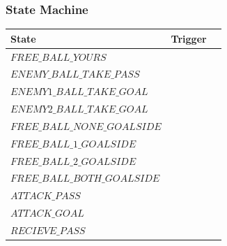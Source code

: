 \documentclass[a4paper,12pt]{article}
\begin{document}
\subsubsection{State Machine}
\begin{tabular}{|l|l|l|}
\hline
State & Trigger\\ \hline
$FREE\_BALL\_YOURS$ &  \\ \hline
$ENEMY\_BALL\_TAKE\_PASS$ &  \\ \hline
$ENEMY1\_BALL\_TAKE\_GOAL$ &  \\ \hline
$ENEMY2\_BALL\_TAKE\_GOAL$ &  \\ \hline
$FREE\_BALL\_NONE\_GOALSIDE$ &  \\ \hline
$FREE\_BALL\_1\_GOALSIDE$ &  \\ \hline
$FREE\_BALL\_2\_GOALSIDE$ &  \\ \hline
$FREE\_BALL\_BOTH\_GOALSIDE$ &  \\ \hline
$ATTACK\_PASS$ &  \\ \hline
$ATTACK\_GOAL$ &   \\ \hline
$RECIEVE\_PASS$ &  \\ \hline
\end{tabular}
\end{document}
